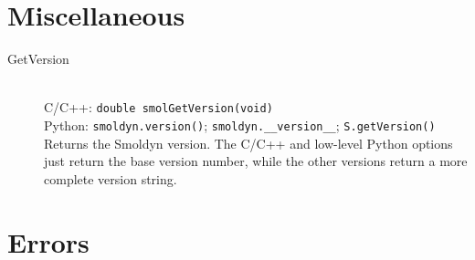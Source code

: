 \documentclass {scrbook}
\newcommand {\ttt} {\texttt}
\begin{document}
\section{Miscellaneous}

\begin{description}

\item[GetVersion]
\hfill \\
C/C++: \ttt{double smolGetVersion(void)}\\
Python: \ttt{smoldyn.version()}; \ttt{smoldyn.\_\_version\_\_}; \ttt{S.getVersion()}\\
Returns the Smoldyn version. The C/C++ and low-level Python options just return the base version number, while the other versions return a more complete version string.

\end{description}

\section{Errors}
\end{document}
